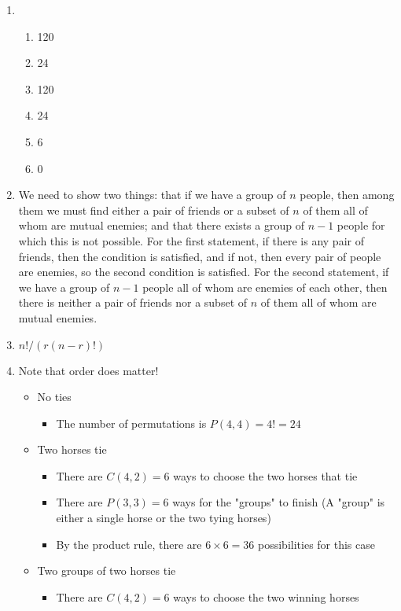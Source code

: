 \documentclass{../../cls/sig-alternate-05-2015}
\begin{document}
\begin{enumerate}

    \item 
    \begin{enumerate}
        \item 120 \item 24 \item 120 \item 24
        \item 6 \item 0
    \end{enumerate}
    \item We need to show two
    things: that if we have a group of $n$ people, then among them
    we must find either a pair of friends or a subset of $n$ of them
    all of whom are mutual enemies; and that there exists a group
    of $n-1$ people for which this is not possible. For the first
    statement, if there is any pair of friends, then the condition is
    satisfied, and if not, then every pair of people are enemies, so
    the second condition is satisfied. For the second statement, if
    we have a group of $n-1$ people all of whom are enemies of
    each other, then there is neither a pair of friends nor a subset
    of $n$ of them all of whom are mutual enemies.
    \item $n!/(r(n - r)!)$
    \item Note that order does matter!
    \begin{itemize}
        \item No ties
            \begin{itemize}
                \item The number of permutations is $P(4,4) = 4! = 24$
            \end{itemize}
        \item Two horses tie
        \begin{itemize}
            \item There are $C(4,2) = 6$ ways to choose the two horses that tie
            \item There are $P(3,3) = 6$ ways for the "groups" to finish (A "group" is either a single horse or the two tying horses)
            \item By the product rule, there are $6\times 6 = 36$ possibilities for this case
        \end{itemize}
        \item Two groups of two horses tie
            \begin{itemize}
                \item There are $C(4,2) = 6$ ways to choose the two winning horses
                

\end{itemize}
\end{itemize}
\end{enumerate}
\end{document}
